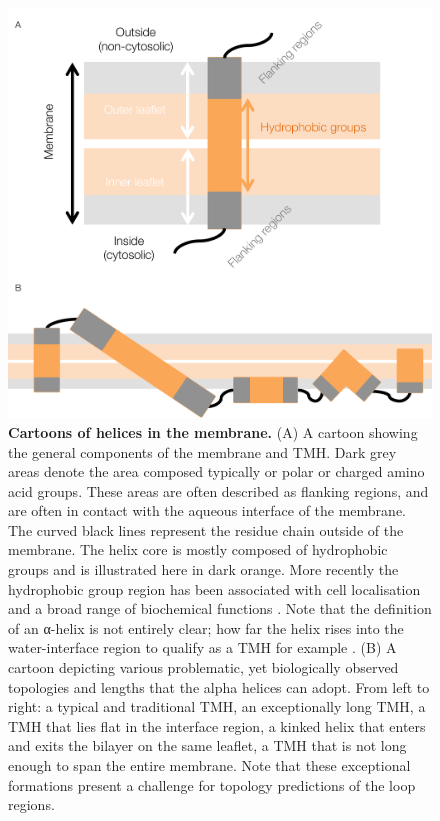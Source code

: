 \documentclass[12pt,PhD,twoside]{muthesis}
\begin{document}
\begin{figure}[h]
\centering
\includegraphics[width=1\textwidth]{Helix_anatomy}
\caption{\textbf{Cartoons of helices in the membrane.}
(A) A cartoon showing the general components of the membrane and TMH. Dark grey areas denote the area composed typically or polar or charged amino acid groups. These areas are often described as flanking regions, and are often in contact with the aqueous interface of the membrane. The curved black lines represent the residue chain outside of the membrane. The helix core is mostly composed of hydrophobic groups and is illustrated here in dark orange. More recently the hydrophobic group region has been associated with cell localisation and a broad range of biochemical functions \cite{Junne2010, Wong2012}. Note that the definition of an α-helix is not entirely clear; how far the helix rises into the water-interface region to qualify as a TMH for example \cite{VonHeijne2006}. (B) A cartoon depicting various problematic, yet biologically observed topologies and lengths that the alpha helices can adopt. From left to right: a typical and traditional TMH, an exceptionally long TMH, a TMH that lies flat in the interface region, a kinked helix that enters and exits the bilayer on the same leaflet, a TMH that is not long enough to span the entire membrane. Note that these exceptional formations present a challenge for topology predictions of the loop regions.}
\label{fig:helixcartoon1}
\end{figure}
\end{document}
